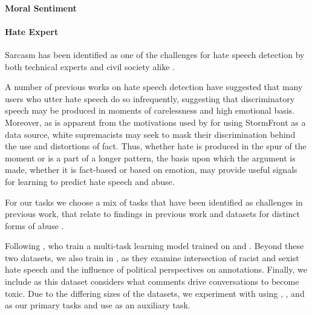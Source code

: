 \paragraph{Moral Sentiment}

\paragraph{Hate Expert}




Sarcasm has been identified as one of the challenges for hate speech detection by both technical experts and civil society alike \citep{Rottger:2021}.

A number of previous works on hate speech detection have suggested that many users who utter hate speech do so infrequently, suggesting that discriminatory speech may be produced in moments of carelessness and high emotional basis. Moreover, as is apparent from the motivations used by \citet{Garcia:2019} for using StormFront as a data source, white supremacists may seek to mask their discrimination behind the use and distortions of fact. Thus, whether hate is produced in the spur of the moment or is a part of a longer pattern, the basis upon which the argument is made, whether it is fact-based or based on emotion, may provide useful signals for learning to predict hate speech and abuse.

For our tasks we choose a mix of tasks that have been identified as challenges in previous work, that relate to findings in previous work \cite{Waseem-Hovy:2016,Davidson:2017,Schmidt:2017} and datasets for distinct forms of abuse \cite{Waseem:2016,Waseem-Hovy:2016,Davidson:2017,Wulczyn:2017}.

Following \citet{Waseem:2018}, who train a multi-task learning model trained on \citet{Waseem-Hovy:2016} and \citet{Davidson:2017}. Beyond these two datasets, we also train in \citet{Waseem:2016}, as they examine intersection of racist and sexist hate speech and the influence of political perspectives on annotations. Finally, we include \citet{Wulczyn:2017} as this dataset considers what comments drive conversations to become toxic. Due to the differing sizes of the datasets, we experiment with using \citet{Wulczyn:2017}, \citet{Davidson:2017}, and \citet{Waseem:2016} as our primary tasks and use \citet{Waseem-Hovy:2016} as an auxiliary task.

